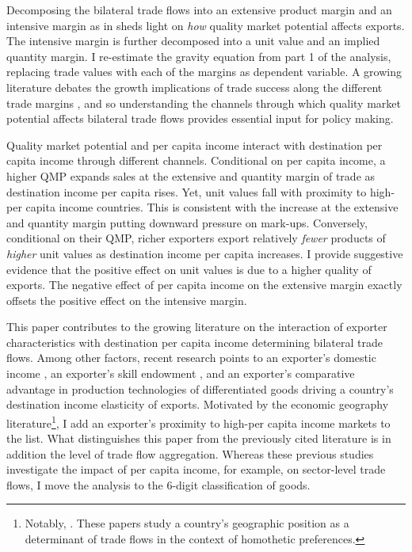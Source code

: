 \documentclass[12pt,a4paper,oneside,times]{article}   	%
\begin{document}
Decomposing the bilateral trade flows into an extensive product margin and an intensive margin as in \cite{Hummels2005} sheds light on \emph{how} quality market potential affects exports. The intensive margin is further decomposed into a unit value and an implied quantity margin. I re-estimate the gravity equation from part 1 of the analysis, replacing trade values with each of the margins as dependent variable.  A growing literature debates the growth implications of trade success along the different trade margins \citep{Besedes2011}, and so understanding the channels through which quality market potential affects bilateral trade flows provides essential input for policy making. 

Quality market potential and per capita income interact with destination per capita income through different channels. Conditional on per capita income, a higher QMP expands sales at the extensive and quantity margin of trade as destination income per capita rises. Yet, unit values fall with proximity to high-per capita income countries. This is consistent with the increase at the extensive and quantity margin putting downward pressure on mark-ups. Conversely, conditional on their QMP, richer exporters export relatively \emph{fewer} products of \emph{higher} unit values as destination income per capita increases. I provide suggestive evidence that the positive effect on unit values is due to a higher quality of exports. The negative effect of per capita income on the extensive margin exactly offsets the positive effect on the intensive margin. 



This paper contributes to the growing literature on the interaction of exporter characteristics with destination per capita income determining bilateral trade flows. Among other factors, recent research points to an exporter's domestic income \citep{Hallak2006}, an exporter's skill endowment \citep{Caron2014}, and an exporter's comparative advantage in production technologies of differentiated goods \citep{Fieler2011} driving a country's destination income elasticity of exports. Motivated by the economic geography literature\footnote{Notably, \cite{Fujita1999,Davis2003,Behrens2009}. These papers study a country's geographic position as a determinant of trade flows in the context of homothetic preferences.}, I add an exporter's proximity to high-per capita income markets to the list. What distinguishes this paper from the previously cited literature is in addition the level of trade flow aggregation. Whereas these previous studies investigate the impact of per capita income, for example, on sector-level trade flows, I move the analysis to the 6-digit classification of goods. 
\end{document}
